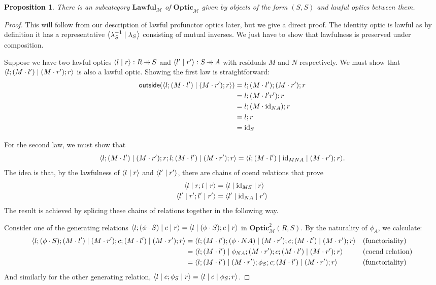\documentclass[11pt,letterpaper]{article}
\theoremstyle{plain}
\newtheorem{proposition}[theorem]{Proposition}
\theoremstyle{definition}
\newcommand{\M}{\mathscr{M}}
\newcommand{\Optic}{\mathbf{Optic}}
\newcommand{\Twoptic}{\mathbf{Optic}^2}
\newcommand{\Lawful}{\mathbf{Lawful}}
\newcommand{\id}{\mathrm{id}}
\newcommand{\act}{\cdot}
\newcommand{\rep}[2]{{\ensuremath \left\langle #1 \mid #2 \right\rangle}}
\newcommand{\repthree}[3]{{\ensuremath \langle #1 \mid #2 \mid #3 \rangle}}
\newcommand{\outside}{\mathsf{outside}}
\newcommand{\hto}{\ensuremath{\,\mathaccent\shortmid\rightarrow\,}}
\begin{document}
\begin{proposition}\label{prop:lawful-category}
  There is an subcategory $\Lawful_\M$ of $\Optic_\M$ given by objects of the form $(S, S)$ and lawful optics between them.
\end{proposition}
\begin{proof}
  This will follow from our description of lawful profunctor optics later, but we give a direct proof. The identity optic is lawful as by definition it has a representative $\rep{\lambda_S^{-1}}{\lambda_S}$ consisting of mutual inverses. We just have to show that lawfulness is preserved under composition.

  Suppose we have two lawful optics $\rep{l}{r} : R \hto S$ and $\rep{l'}{r'} : S \hto A$ with residuals $M$ and $N$ respectively. We must show that $\rep{l;(M\act l')}{(M\act r');r}$ is also a lawful optic. Showing the first law is straightforward:
  \begin{align*}
    \outside(\rep{l; (M\act l')}{(M\act r') ; r})
    &= l ; (M \act l') ; (M \act r') ; r \\
    &= l ; (M \act l'r') ; r \\
    &= l ; (M \act \id_{NA}) ; r \\
    &= l ; r \\
    &= \id_S
  \end{align*}

  For the second law, we must show that
  \[ \repthree{ l;(M\act l')}{(M\act r'); r;l;(M\act l')}{(M\act r') ; r} = \repthree{l;(M\act l')}{\id_{MNA}}{(M\act r') ; r}. \]
  The idea is that, by the lawfulness of $\rep{l}{r}$ and $\rep{l'}{r'}$, there are chains of coend relations that prove
  \begin{align*}
  \repthree{l}{r;l}{r} &= \repthree{l}{\id_{MS}}{r} \\
  \repthree{l'}{r';l'}{r'} &= \repthree{l'}{\id_{NA}}{r'}
  \end{align*}
  The result is achieved by splicing these chains of relations together in the following way.

  Consider one of the generating relations $\repthree{l;(\phi \act S)}{c}{r} = \repthree{l}{(\phi \act S) ; c}{r}$ in $\Twoptic_\M(R, S)$. By the naturality of $\phi_A$, we calculate:
  \begin{align*}
    \repthree{l;(\phi \act S);(M \act l')}{(M\act r'); c ;(M\act l')}{(M\act r') ; r}
    &= \repthree{l;(M \act l');(\phi \act NA)}{(M \act r'); c ;(M \act l')}{(M \act r') ; r} && \text{(functoriality)} \\
    &= \repthree{l;(M \act l')}{\phi_{NA};(M \act r'); c ;(M \act l')}{(M \act r') ; r} && \text{(coend relation)} \\
    &= \repthree{l;(M \act l')}{(M \act r');\phi_{S}; c ;(M \act l')}{(M \act r') ; r} && \text{(functoriality)}
  \end{align*}
  And similarly for the other generating relation, $\repthree{l}{c;\phi_S}{r} = \repthree{l}{c}{\phi_S; r}$.
  

\end{proof}
\end{document}
